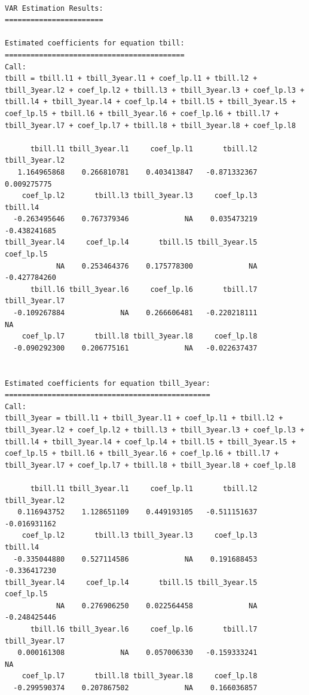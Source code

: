 \documentclass[
  letterpaper,
  DIV=11,
  numbers=noendperiod]{scrartcl}
\begin{document}
\begin{verbatim}

VAR Estimation Results:
======================= 

Estimated coefficients for equation tbill: 
========================================== 
Call:
tbill = tbill.l1 + tbill_3year.l1 + coef_lp.l1 + tbill.l2 + tbill_3year.l2 + coef_lp.l2 + tbill.l3 + tbill_3year.l3 + coef_lp.l3 + tbill.l4 + tbill_3year.l4 + coef_lp.l4 + tbill.l5 + tbill_3year.l5 + coef_lp.l5 + tbill.l6 + tbill_3year.l6 + coef_lp.l6 + tbill.l7 + tbill_3year.l7 + coef_lp.l7 + tbill.l8 + tbill_3year.l8 + coef_lp.l8 

      tbill.l1 tbill_3year.l1     coef_lp.l1       tbill.l2 tbill_3year.l2 
   1.164965868    0.266810781    0.403413847   -0.871332367    0.009275775 
    coef_lp.l2       tbill.l3 tbill_3year.l3     coef_lp.l3       tbill.l4 
  -0.263495646    0.767379346             NA    0.035473219   -0.438241685 
tbill_3year.l4     coef_lp.l4       tbill.l5 tbill_3year.l5     coef_lp.l5 
            NA    0.253464376    0.175778300             NA   -0.427784260 
      tbill.l6 tbill_3year.l6     coef_lp.l6       tbill.l7 tbill_3year.l7 
  -0.109267884             NA    0.266606481   -0.220218111             NA 
    coef_lp.l7       tbill.l8 tbill_3year.l8     coef_lp.l8 
  -0.090292300    0.206775161             NA   -0.022637437 


Estimated coefficients for equation tbill_3year: 
================================================ 
Call:
tbill_3year = tbill.l1 + tbill_3year.l1 + coef_lp.l1 + tbill.l2 + tbill_3year.l2 + coef_lp.l2 + tbill.l3 + tbill_3year.l3 + coef_lp.l3 + tbill.l4 + tbill_3year.l4 + coef_lp.l4 + tbill.l5 + tbill_3year.l5 + coef_lp.l5 + tbill.l6 + tbill_3year.l6 + coef_lp.l6 + tbill.l7 + tbill_3year.l7 + coef_lp.l7 + tbill.l8 + tbill_3year.l8 + coef_lp.l8 

      tbill.l1 tbill_3year.l1     coef_lp.l1       tbill.l2 tbill_3year.l2 
   0.116943752    1.128651109    0.449193105   -0.511151637   -0.016931162 
    coef_lp.l2       tbill.l3 tbill_3year.l3     coef_lp.l3       tbill.l4 
  -0.335044880    0.527114586             NA    0.191688453   -0.336417230 
tbill_3year.l4     coef_lp.l4       tbill.l5 tbill_3year.l5     coef_lp.l5 
            NA    0.276906250    0.022564458             NA   -0.248425446 
      tbill.l6 tbill_3year.l6     coef_lp.l6       tbill.l7 tbill_3year.l7 
   0.000161308             NA    0.057006330   -0.159333241             NA 
    coef_lp.l7       tbill.l8 tbill_3year.l8     coef_lp.l8 
  -0.299590374    0.207867502             NA    0.166036857 



\end{verbatim}
\end{document}
